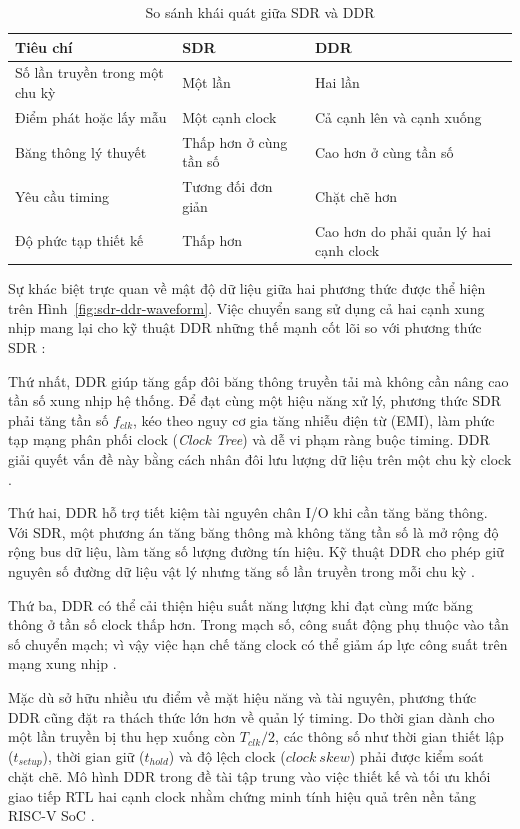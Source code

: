\begin{table}[htbp]
\centering
\caption{So sánh khái quát giữa SDR và DDR}
\label{tab:sdr-ddr-comparison}
\begin{tabular}{|>{\raggedright\arraybackslash}p{3.2cm}|>{\raggedright\arraybackslash}p{5.2cm}|>{\raggedright\arraybackslash}p{5.2cm}|}
\hline
Tiêu chí & SDR & DDR \\
\hline
Số lần truyền trong một chu kỳ & Một lần & Hai lần \\
\hline
Điểm phát hoặc lấy mẫu & Một cạnh clock & Cả cạnh lên và cạnh xuống \\
\hline
Băng thông lý thuyết & Thấp hơn ở cùng tần số & Cao hơn ở cùng tần số \\
\hline
Yêu cầu timing & Tương đối đơn giản & Chặt chẽ hơn \\
\hline
Độ phức tạp thiết kế & Thấp hơn & Cao hơn do phải quản lý hai cạnh clock \\
\hline
\end{tabular}
\end{table}

Sự khác biệt trực quan về mật độ dữ liệu giữa hai phương thức được thể hiện trên Hình~\ref{fig:sdr-ddr-waveform}. Việc chuyển sang sử dụng cả hai cạnh xung nhịp mang lại cho kỹ thuật DDR những thế mạnh cốt lõi so với phương thức SDR \cite{ejaz2018ddrnoc,psarras2017nocddr}:

Thứ nhất, DDR giúp tăng gấp đôi băng thông truyền tải mà không cần nâng cao tần số xung nhịp hệ thống. Để đạt cùng một hiệu năng xử lý, phương thức SDR phải tăng tần số $f_{clk}$, kéo theo nguy cơ gia tăng nhiễu điện từ (EMI), làm phức tạp mạng phân phối clock (\textit{Clock Tree}) và dễ vi phạm ràng buộc timing. DDR giải quyết vấn đề này bằng cách nhân đôi lưu lượng dữ liệu trên một chu kỳ clock \cite{psarras2017nocddr,amd_ug949}.

Thứ hai, DDR hỗ trợ tiết kiệm tài nguyên chân I/O khi cần tăng băng thông. Với SDR, một phương án tăng băng thông mà không tăng tần số là mở rộng độ rộng bus dữ liệu, làm tăng số lượng đường tín hiệu. Kỹ thuật DDR cho phép giữ nguyên số đường dữ liệu vật lý nhưng tăng số lần truyền trong mỗi chu kỳ \cite{jedec_ddr,shashikumar2010ahbddr}.

Thứ ba, DDR có thể cải thiện hiệu suất năng lượng khi đạt cùng mức băng thông ở tần số clock thấp hơn. Trong mạch số, công suất động phụ thuộc vào tần số chuyển mạch; vì vậy việc hạn chế tăng clock có thể giảm áp lực công suất trên mạng xung nhịp \cite{amd_ug949}.

Mặc dù sở hữu nhiều ưu điểm về mặt hiệu năng và tài nguyên, phương thức DDR cũng đặt ra thách thức lớn hơn về quản lý timing. Do thời gian dành cho một lần truyền bị thu hẹp xuống còn $T_{clk}/2$, các thông số như thời gian thiết lập ($t_{setup}$), thời gian giữ ($t_{hold}$) và độ lệch clock ($clock\ skew$) phải được kiểm soát chặt chẽ. Mô hình DDR trong đề tài tập trung vào việc thiết kế và tối ưu khối giao tiếp RTL hai cạnh clock nhằm chứng minh tính hiệu quả trên nền tảng RISC-V SoC \cite{amd_ug949,psarras2017nocddr}.

